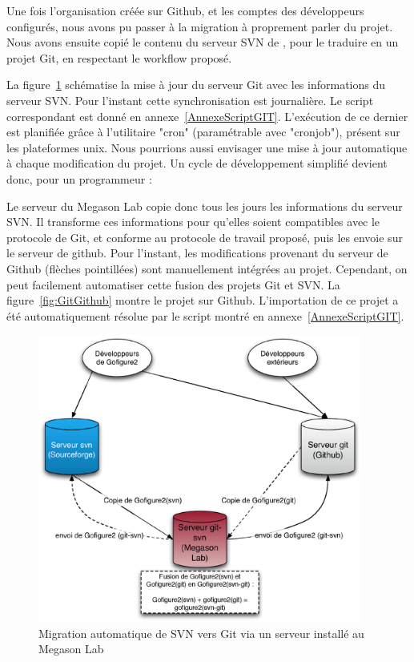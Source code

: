 Une fois l'organisation {\gofigure} créée sur Github, et les comptes des développeurs configurés, nous avons pu passer à la migration à proprement parler du projet.
Nous avons ensuite copié le contenu du serveur SVN de {\gofigure},
pour le traduire en un projet Git, en respectant le workflow proposé.

La figure~\ref{fig:MigrationGit} schématise la mise à jour du serveur Git avec les informations du serveur SVN.
Pour l'instant cette synchronisation est journalière. Le script correspondant est donné en annexe~\ref{AnnexeScriptGIT}. L'exécution de ce dernier est planifiée grâce à l'utilitaire "cron" (paramétrable avec "cronjob"), présent sur les plateformes unix.
Nous pourrions aussi envisager une mise à jour automatique à chaque modification du projet.
Un cycle de développement simplifié devient donc, pour un programmeur :

Le serveur du Megason Lab copie donc tous les jours les informations du serveur SVN.
Il transforme ces informations pour qu'elles soient compatibles avec le protocole de Git,
et conforme au protocole de travail proposé, puis les envoie sur le serveur de github.
Pour l'instant, les modifications provenant du serveur de Github (flèches pointillées)
sont manuellement intégrées au projet. Cependant, on peut facilement automatiser cette fusion des projets Git et SVN.
La figure~\ref{fig:GitGithub} montre le projet {\gofigure} sur Github. L'importation de ce projet a été automatiquement résolue par le script montré en annexe~\ref{AnnexeScriptGIT}.

\begin{figure}[h]
\begin{center}
\leavevmode
\includegraphics[width=0.95\textwidth]{pictures/GitTransfert}
\end{center}
\caption{Migration automatique de SVN vers Git via un serveur installé au Megason Lab}
\label{fig:MigrationGit}
\end{figure}


